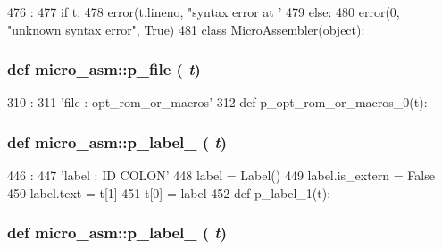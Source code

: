 \begin{DoxyCode}
476               :
477     if t:
478         error(t.lineno, "syntax error at '%
479     else:
480         error(0, "unknown syntax error", True)
481 
class MicroAssembler(object):
\end{DoxyCode}
\hypertarget{namespacemicro__asm_a61564c360e71827a5ab5edf7e138e4c1}{
\subsubsection[{p\_\-file}]{\setlength{\rightskip}{0pt plus 5cm}def micro\_\-asm::p\_\-file ( {\em t})}}
\label{namespacemicro__asm_a61564c360e71827a5ab5edf7e138e4c1}



\begin{DoxyCode}
310              :
311     'file : opt_rom_or_macros'
312 
def p_opt_rom_or_macros_0(t):
\end{DoxyCode}
\hypertarget{namespacemicro__asm_aa02e5ebc42f155c23b13bfd0eb35bd9d}{
\subsubsection[{p\_\-label\_\-0}]{\setlength{\rightskip}{0pt plus 5cm}def micro\_\-asm::p\_\-label\_ ( {\em t})}}
\label{namespacemicro__asm_aa02e5ebc42f155c23b13bfd0eb35bd9d}



\begin{DoxyCode}
446                 :
447     'label : ID COLON'
448     label = Label()
449     label.is_extern = False
450     label.text = t[1]
451     t[0] = label
452 
def p_label_1(t):
\end{DoxyCode}
\hypertarget{namespacemicro__asm_a7e3b6c397967ee0c9f541f8c1b388cd5}{
\subsubsection[{p\_\-label\_\-1}]{\setlength{\rightskip}{0pt plus 5cm}def micro\_\-asm::p\_\-label\_ ( {\em t})}}
\label{namespacemicro__asm_a7e3b6c397967ee0c9f541f8c1b388cd5}




